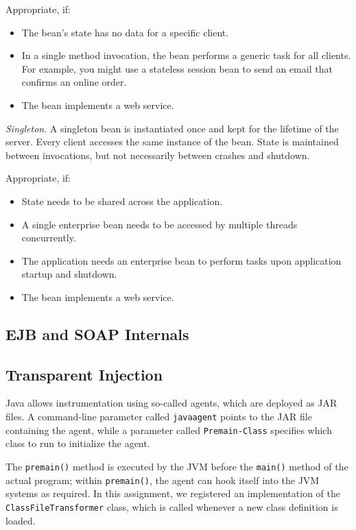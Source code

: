 \documentclass[a4paper,10pt]{article}
\begin{document}
Appropriate, if: 

\begin{itemize}
    \item The bean’s state has no data for a specific client.
    \item In a single method invocation, the bean performs a generic task for all clients. For example, you might use a stateless session bean to send an email that confirms an online order.
    \item The bean implements a web service.
\end{itemize}

\emph{Singleton}. A singleton bean is instantiated once and kept for the lifetime of the server.
Every client accesses the same instance of the bean. State is maintained between invocations,
but not necessarily between crashes and shutdown.

Appropriate, if: 

\begin{itemize}
    \item State needs to be shared across the application.
    \item A single enterprise bean needs to be accessed by multiple threads concurrently.
    \item The application needs an enterprise bean to perform tasks upon application startup and shutdown.
    \item The bean implements a web service.
\end{itemize}

\subsection{EJB and SOAP Internals}

\begin{comment}
Study EJB and SOAP network traffic, discuss these in some detail.
\end{comment}

\subsection{Transparent Injection}

Java allows instrumentation using so-called agents, which are deployed as JAR files.
A command-line parameter called \verb|javaagent| points to the JAR file containing the agent, while
a parameter called \verb|Premain-Class| specifies which class to run to initialize the agent.

The \lstinline|premain()| method is executed by the JVM before the \lstinline|main()|
method of the actual program; within \lstinline|premain()|, the agent can hook itself
into the JVM systems as required. In this assignment, we registered an implementation
of the \lstinline|ClassFileTransformer| class, which is called whenever a new class
definition is loaded.
\end{document}
